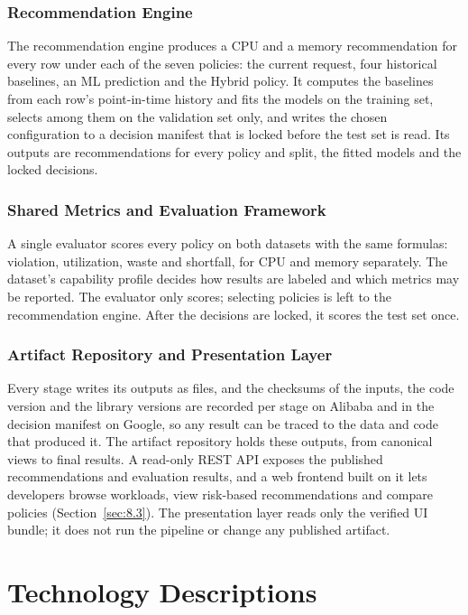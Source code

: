 \documentclass{IEEEtran}
\begin{document}
\subsubsection{Recommendation Engine}\label{sec:2.2.4}

The recommendation engine produces a CPU and a memory recommendation for every row under each of the seven policies: the current request, four historical baselines, an ML prediction and the Hybrid policy. It computes the baselines from each row's point-in-time history and fits the models on the training set, selects among them on the validation set only, and writes the chosen configuration to a decision manifest that is locked before the test set is read. Its outputs are recommendations for every policy and split, the fitted models and the locked decisions.

\subsubsection{Shared Metrics and Evaluation Framework}\label{sec:2.2.5}

A single evaluator scores every policy on both datasets with the same formulas: violation, utilization, waste and shortfall, for CPU and memory separately. The dataset's capability profile decides how results are labeled and which metrics may be reported. The evaluator only scores; selecting policies is left to the recommendation engine. After the decisions are locked, it scores the test set once.

\subsubsection{Artifact Repository and Presentation Layer}\label{sec:2.2.6}

Every stage writes its outputs as files, and the checksums of the inputs, the code version and the library versions are recorded per stage on Alibaba and in the decision manifest on Google, so any result can be traced to the data and code that produced it. The artifact repository holds these outputs, from canonical views to final results. A read-only REST API exposes the published recommendations and evaluation results, and a web frontend built on it lets developers browse workloads, view risk-based recommendations and compare policies (Section~\ref{sec:8.3}). The presentation layer reads only the verified UI bundle; it does not run the pipeline or change any published artifact.

\section{Technology Descriptions}\label{sec:3}
\end{document}
